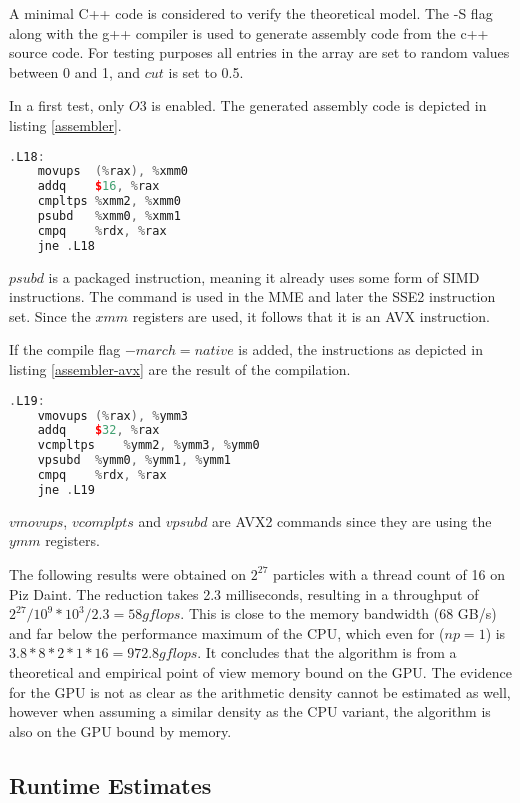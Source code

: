 \documentclass[]{article}
\begin{document}
A minimal C++ code is considered to verify the theoretical model. The -S flag along with the g++ compiler is used to generate assembly code from the c++ source code. For testing purposes all entries in the array are set to random values between 0 and 1, and $cut$ is set to 0.5.

In a first test, only $O3$ is enabled. The generated assembly code is depicted in listing \ref{assembler}.

\begin{lstlisting}[language=c++, caption=Reduction Assembler Code without AVX, label=assembler]
.L18:
	movups	(%rax), %xmm0
	addq	$16, %rax
	cmpltps	%xmm2, %xmm0
	psubd	%xmm0, %xmm1
	cmpq	%rdx, %rax
	jne	.L18

\end{lstlisting}

$psubd$ is a packaged instruction, meaning it already uses some form of SIMD instructions. The command is used in the MME and later the SSE2 instruction set. Since the $xmm$ registers are used, it follows that it is an AVX instruction.

If the compile flag $-march=native$ is added, the instructions as depicted in listing \ref{assembler-avx} are the result of the compilation.

\begin{lstlisting}[language=c++, caption=Reduction Assembler Code with AVX2, label=assembler-avx]
.L19:
	vmovups	(%rax), %ymm3
	addq	$32, %rax
	vcmpltps	%ymm2, %ymm3, %ymm0
	vpsubd	%ymm0, %ymm1, %ymm1
	cmpq	%rdx, %rax
	jne	.L19	

\end{lstlisting}

$vmovups$, $vcomplpts$ and $vpsubd$ are AVX2 commands since they are using the $ymm$ registers.

The following results were obtained on $2^{27}$ particles with a thread count of 16 on Piz Daint. The reduction takes 2.3 milliseconds, resulting in a throughput of $2^{27} / 10^{9} * 10^3 / 2.3 = 58 gflops$. This is close to the memory bandwidth (68 GB/s) and far below the performance maximum of the CPU, which even for ($np = 1$) is $3.8 * 8 * 2 * 1 * 16 = 972.8 gflops$. It concludes that the algorithm is from a theoretical and empirical point of view memory bound on the GPU. The evidence for the GPU is not as clear as the arithmetic density cannot be estimated as well, however when assuming a similar density as the CPU variant, the algorithm is also on the GPU bound by memory.


\subsection{Runtime Estimates}
\end{document}
